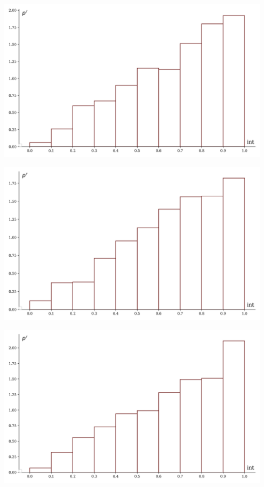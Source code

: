 \documentclass[a4paper, 14pt]{extarticle}
\begin{document}
\begin{minipage}[t]{0.25\textwidth}
\includegraphics[width=\textwidth, height=\textheight, keepaspectratio]{sample9_hist}
\end{minipage}%
\begin{minipage}[t]{0.25\textwidth}
\includegraphics[width=\textwidth, height=\textheight, keepaspectratio]{sample10_hist}
\end{minipage}%
\begin{minipage}[t]{0.25\textwidth}
\includegraphics[width=\textwidth, height=\textheight, keepaspectratio]{sample11_hist}
\end{minipage}%
\end{document}
